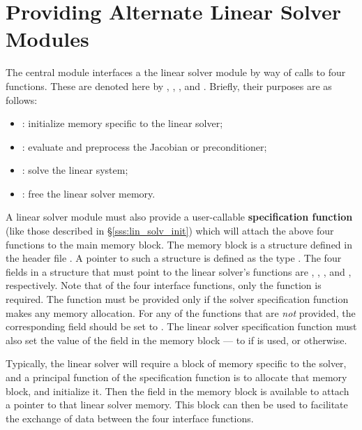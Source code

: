 \chapter{Providing Alternate Linear Solver Modules}\label{s:new_linsolv}
The central {\cvodes} module interfaces a the linear solver module 
by way of calls to four functions.  These are denoted here by 
, , , and .
Briefly, their purposes are as follows:
\begin{itemize}
\item {}: initialize memory specific to the linear solver;
\item {}: evaluate and preprocess the Jacobian or preconditioner;
\item {}: solve the linear system;
\item {}: free the linear solver memory.
\end{itemize}
A linear solver module must also provide a user-callable {\bf specification function}
(like those described in \S\ref{sss:lin_solv_init}) which will
attach the above four functions to the main {\cvodes} memory block.
The {\cvodes} memory block is a structure defined in the header file
.  A pointer to such a structure is defined as the
type .  The four fields in a  structure that
must point to the linear solver's functions are ,
, , and , respectively.
Note that of the four interface functions, only the  function
is required.  The  function must be provided only if the solver
specification function makes any memory allocation.   For any of the functions
that are {\it not} provided, the corresponding field should be set to .
The linear solver specification function must also set the value of
the field  in the {\cvodes} memory block --- to
 if  is used, or  otherwise.

Typically, the linear solver will require a block of memory specific
to the solver, and a principal function of the specification function
is to allocate that memory block, and initialize it.  Then the field
 in the {\cvodes} memory block is available to attach a
pointer to that linear solver memory.  This block can then be used
to facilitate the exchange of data between the four interface
functions.

